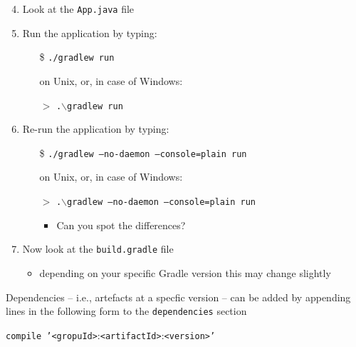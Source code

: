 \documentclass[handout]{beamer}\mode<presentation>{\usetheme{AMSCesenaBleu}}
\begin{document}
\begin{frame}[allowframebreaks]
    \framebreak
    
    \begin{enumerate}\setcounter{enumi}{3}
        \item Look at the \texttt{App.java} file
        \item Run the application by typing:
        \begin{itemize}
            \item[\$] \texttt{./gradlew run}
            \item[] on Unix, or, in case of Windows:
            \item[$>$] \texttt{.$\backslash$gradlew run}
            \item[]
        \end{itemize}
        \item Re-run the application by typing:
        \begin{itemize}
            \item[\$] \texttt{./gradlew \alert{--no-daemon --console=plain} run}
            \item[] on Unix, or, in case of Windows:
            \item[$>$] \texttt{.$\backslash$gradlew \alert{--no-daemon --console=plain} run}
            \begin{itemize}
                \item Can you spot the differences?
            \end{itemize}
        \end{itemize}
    \end{enumerate}
        
    \framebreak
    
    \begin{enumerate}\setcounter{enumi}{6}
        \item Now look at the \texttt{build.gradle} file
        \begin{itemize}
            \item depending on your specific Gradle version this may change slightly
        \end{itemize}
    \end{enumerate}
    
    
    Dependencies -- i.e., artefacts at a specfic version -- can be added by appending lines in the following form to the \texttt{dependencies} section
    \begin{center}
        \texttt{compile '<gropuId>}\alert{:}\texttt{<artifactId>}\alert{:}\texttt{<version>'}
    \end{center}
    

\end{frame}
\end{document}
